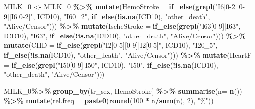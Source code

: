 \documentclass[
]{article}
\newenvironment{Shaded}{\begin{snugshade}}{\end{snugshade}}
\newcommand{\DataTypeTok}[1]{\textcolor[rgb]{0.13,0.29,0.53}{#1}}
\newcommand{\DecValTok}[1]{\textcolor[rgb]{0.00,0.00,0.81}{#1}}
\newcommand{\KeywordTok}[1]{\textcolor[rgb]{0.13,0.29,0.53}{\textbf{#1}}}
\newcommand{\NormalTok}[1]{#1}
\newcommand{\OperatorTok}[1]{\textcolor[rgb]{0.81,0.36,0.00}{\textbf{#1}}}
\newcommand{\StringTok}[1]{\textcolor[rgb]{0.31,0.60,0.02}{#1}}
\begin{document}
\begin{Shaded}
\begin{Highlighting}[]
\NormalTok{MILK\_}\DecValTok{0}\NormalTok{ \textless{}{-}}\StringTok{ }\NormalTok{MILK\_}\DecValTok{0} \OperatorTok{\%\textgreater{}\%}\StringTok{ }
\StringTok{  }\KeywordTok{mutate}\NormalTok{(}\DataTypeTok{HemoStroke =} \KeywordTok{if\_else}\NormalTok{(}\KeywordTok{grepl}\NormalTok{(}\StringTok{"I6[0{-}2][0{-}9]|I6[0{-}2]"}\NormalTok{,  }
\NormalTok{                                    ICD10), }\StringTok{"I60\_2"}\NormalTok{, }
                              \KeywordTok{if\_else}\NormalTok{(}\OperatorTok{!}\KeywordTok{is.na}\NormalTok{(ICD10), }\StringTok{"other\_death"}\NormalTok{, }
                                      \StringTok{"Alive/Censor"}\NormalTok{))) }\OperatorTok{\%\textgreater{}\%}\StringTok{ }
\StringTok{  }\KeywordTok{mutate}\NormalTok{(}\DataTypeTok{IscheStroke =} \KeywordTok{if\_else}\NormalTok{(}\KeywordTok{grepl}\NormalTok{(}\StringTok{"I63[0{-}9]|I63"}\NormalTok{,  }
\NormalTok{                                    ICD10), }\StringTok{"I63"}\NormalTok{, }
                              \KeywordTok{if\_else}\NormalTok{(}\OperatorTok{!}\KeywordTok{is.na}\NormalTok{(ICD10), }\StringTok{"other\_death"}\NormalTok{, }
                                      \StringTok{"Alive/Censor"}\NormalTok{))) }\OperatorTok{\%\textgreater{}\%}
\StringTok{  }\KeywordTok{mutate}\NormalTok{(}\DataTypeTok{CHD =} \KeywordTok{if\_else}\NormalTok{(}\KeywordTok{grepl}\NormalTok{(}\StringTok{"I2[0{-}5][0{-}9]|I2[0{-}5]"}\NormalTok{,  }
\NormalTok{                                     ICD10), }\StringTok{"I20\_5"}\NormalTok{, }
                               \KeywordTok{if\_else}\NormalTok{(}\OperatorTok{!}\KeywordTok{is.na}\NormalTok{(ICD10), }\StringTok{"other\_death"}\NormalTok{, }
                                       \StringTok{"Alive/Censor"}\NormalTok{))) }\OperatorTok{\%\textgreater{}\%}
\StringTok{  }\KeywordTok{mutate}\NormalTok{(}\DataTypeTok{HeartF =} \KeywordTok{if\_else}\NormalTok{(}\KeywordTok{grepl}\NormalTok{(}\StringTok{"I50[0{-}9]|I50"}\NormalTok{,  }
\NormalTok{                                     ICD10), }\StringTok{"I50"}\NormalTok{, }
                               \KeywordTok{if\_else}\NormalTok{(}\OperatorTok{!}\KeywordTok{is.na}\NormalTok{(ICD10), }\StringTok{"other\_death"}\NormalTok{, }
                                       \StringTok{"Alive/Censor"}\NormalTok{)))}


\NormalTok{MILK\_}\DecValTok{0}\OperatorTok{\%\textgreater{}\%}\StringTok{ }
\StringTok{  }\KeywordTok{group\_by}\NormalTok{(tr\_sex, HemoStroke) }\OperatorTok{\%\textgreater{}\%}
\StringTok{  }\KeywordTok{summarise}\NormalTok{(}\DataTypeTok{n=} \KeywordTok{n}\NormalTok{()) }\OperatorTok{\%\textgreater{}\%}
\StringTok{  }\KeywordTok{mutate}\NormalTok{(}\DataTypeTok{rel.freq =} \KeywordTok{paste0}\NormalTok{(}\KeywordTok{round}\NormalTok{(}\DecValTok{100} \OperatorTok{*}\StringTok{ }\NormalTok{n}\OperatorTok{/}\KeywordTok{sum}\NormalTok{(n), }\DecValTok{2}\NormalTok{), }\StringTok{"\%"}\NormalTok{))}
\end{Highlighting}
\end{Shaded}
\end{document}
